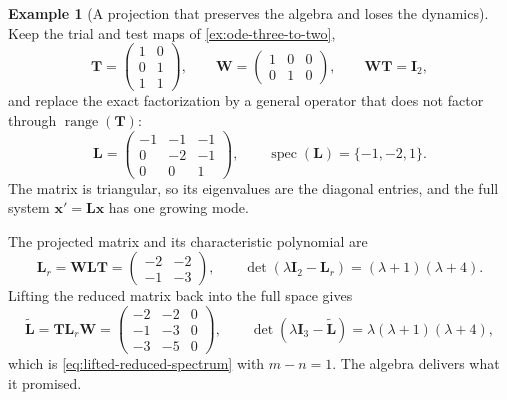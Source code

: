 \documentclass[11pt]{article}
\newcommand{\I}{\mathbf{I}}
\newcommand{\mat}[1]{\mathbf{#1}}
\newcommand{\vect}[1]{\mathbf{#1}}
\newcommand{\range}{\operatorname{range}}
\newcommand{\spec}{\operatorname{spec}}
\theoremstyle{definition}
\newtheorem{example}[example]{Example}
\theoremstyle{remark}
\begin{document}
\begin{example}[A projection that preserves the algebra and loses the dynamics]
\label{ex:projection-failure}
Keep the trial and test maps of \cref{ex:ode-three-to-two},
\[
  \mat{T}=
  \begin{pmatrix}
    1&0\\
    0&1\\
    1&1
  \end{pmatrix},
  \qquad
  \mat{W}=
  \begin{pmatrix}
    1&0&0\\
    0&1&0
  \end{pmatrix},
  \qquad
  \mat{W}\mat{T}=\I_2,
\]
and replace the exact factorization by a general operator that does not factor through \(\range(\mat{T})\):
\begin{equation}
  \mat{L}=
  \begin{pmatrix}
    -1&-1&-1\\
     0&-2&-1\\
     0& 0& 1
  \end{pmatrix},
  \qquad
  \spec(\mat{L})=\{-1,-2,1\}.
  \label{eq:projection-example-L}
\end{equation}
The matrix is triangular, so its eigenvalues are the diagonal entries, and the full system \(\vect{x}'=\mat{L}\vect{x}\) has one growing mode.

The projected matrix and its characteristic polynomial are
\begin{equation}
  \mat{L}_r
  =\mat{W}\mat{L}\mat{T}
  =
  \begin{pmatrix}
    -2&-2\\
    -1&-3
  \end{pmatrix},
  \qquad
  \det(\lambda\I_2-\mat{L}_r)
  =(\lambda+1)(\lambda+4).
  \label{eq:projection-example-Lr}
\end{equation}
Lifting the reduced matrix back into the full space gives
\begin{equation}
  \widetilde{\mat{L}}
  =\mat{T}\mat{L}_r\mat{W}
  =
  \begin{pmatrix}
    -2&-2&0\\
    -1&-3&0\\
    -3&-5&0
  \end{pmatrix},
  \qquad
  \det(\lambda\I_3-\widetilde{\mat{L}})
  =\lambda(\lambda+1)(\lambda+4),
  \label{eq:projection-example-lifted}
\end{equation}
which is \cref{eq:lifted-reduced-spectrum} with \(m-n=1\). The algebra delivers what it promised.


\end{example}
\end{document}
